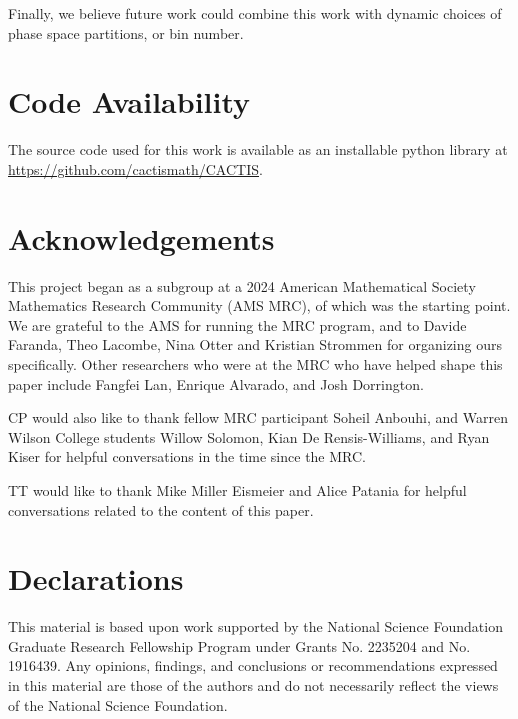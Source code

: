 \documentclass[pdflatex,bst/sn-mathphys-num]{sn-jnl}%
\theoremstyle{thmstyleone}%
\theoremstyle{definition}
\theoremstyle{thmstyletwo}%
\theoremstyle{thmstylethree}%
\begin{document}
Finally, we believe future work could combine this work with dynamic choices of phase space partitions, or bin number. 



\backmatter


\section*{Code Availability}\label{sec:code}
The source code used for this work is available as an installable python library at \url{https://github.com/cactismath/CACTIS}.

\section*{Acknowledgements}

This project began as a subgroup at a 2024 American Mathematical Society Mathematics Research Community (AMS MRC), of which \cite{Faranda_2024} was the starting point. We are grateful to the AMS for running the MRC program, and to Davide Faranda, Theo Lacombe, Nina Otter and Kristian Strommen for organizing ours specifically. Other researchers who were at the MRC who have helped shape this paper include Fangfei Lan, Enrique Alvarado, and Josh Dorrington. 

CP would also like to thank fellow MRC participant Soheil Anbouhi, and Warren Wilson College students Willow Solomon, Kian De Rensis-Williams, and Ryan Kiser for helpful conversations in the time since the MRC. 

TT would like to thank Mike Miller Eismeier and Alice Patania for helpful conversations related to the content of this paper.

\section*{Declarations}


This material is based upon work supported by the National Science Foundation Graduate 
Research Fellowship Program under Grants No. 2235204 and No. 1916439. Any opinions, findings, 
and conclusions or recommendations expressed in this material are those of the authors 
and do not necessarily reflect the views of the National Science Foundation.


\end{document}
